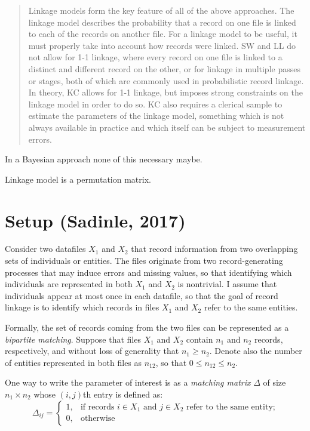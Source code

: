 \documentclass[11pt,reqno]{amsart}
\begin{document}
\begin{quote}
Linkage models form the key feature of all of the above approaches. The linkage model
describes the probability that a record on one file is linked to each of the records on another
file. For a linkage model to be useful, it must properly take into account how records were
linked. SW and LL do not allow for 1-1 linkage, where every record on one file is linked to
a distinct and different record on the other, or for linkage in multiple passes or stages,
both of which are commonly used in probabilistic record linkage. In theory, KC allows
for 1-1 linkage, but imposes strong constraints on the linkage model in order to do so.
KC also requires a clerical sample to estimate the parameters of the linkage model,
something which is not always available in practice and which itself can be subject to
measurement errors.
\end{quote}

In a Bayesian approach none of this necessary maybe. 

Linkage model is a permutation matrix. 
\section{Setup (Sadinle, 2017)}
Consider two datafiles $X_1$ and $X_2$ that record information from two overlapping sets of individuals or entities.  The files originate from two record-generating processes that may induce errors and missing values, so that identifying which individuals are represented in both $X_1$ and $X_2$ is nontrivial.  I assume that individuals appear at most once in each datafile, so that the goal of record linkage is to identify which records in files $X_1$ and $X_2$ refer to the same entities.  

Formally, the set of records coming from the two files can be represented as a \textit{bipartite matching}.  Suppose that files $X_1$ and $X_2$ contain $n_1$ and $n_2$ records, respectively, and without loss of generality that $n_1 \geq n_2$.  Denote also the number of entities represented in both files as $n_{12}$, so that $0 \leq n_{12} \leq n_2$. 

One way to write the parameter of interest is as a \textit{matching matrix} $\Delta$ of size $n_1\times n_2$ whose $(i,j)$th entry is defined as:
\[ \Delta_{ij} = \begin{cases} 1, & \text{if records $i\in X_1$ and $j\in X_2$ refer to the same entity;} \\ 0, & \text{otherwise} \end{cases} \]
\end{document}
